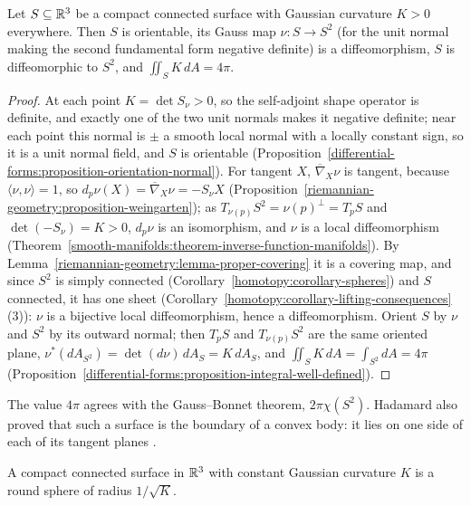 \begin{theorem}[Hadamard]\label{riemannian-geometry:theorem-hadamard}
Let $S \subseteq \mathbb{R}^3$ be a compact connected surface with Gaussian curvature $K > 0$ everywhere. Then $S$ is orientable, its Gauss map $\nu \colon S \to S^2$ (for the unit normal
making the second fundamental form negative definite) is a diffeomorphism, $S$ is diffeomorphic to $S^2$, and $\iint_SK\,dA = 4\pi$.
\end{theorem}

\begin{proof}
At each point $K = \det S_\nu > 0$, so the self-adjoint shape operator is definite, and exactly one of the two unit normals makes it negative definite; near each point this normal is
$\pm$ a smooth local normal with a locally constant sign, so it is a unit normal field, and $S$ is orientable (Proposition~\ref{differential-forms:proposition-orientation-normal}). For
tangent $X$, $\overline{\nabla}_X\nu$ is tangent, because $\langle\nu, \nu\rangle = 1$, so $d_p\nu(X) = \overline{\nabla}_X\nu = -S_\nu X$
(Proposition~\ref{riemannian-geometry:proposition-weingarten}); as $T_{\nu(p)}S^2 = \nu(p)^\perp = T_pS$ and $\det(-S_\nu) = K > 0$, $d_p\nu$ is an isomorphism, and $\nu$ is a local
diffeomorphism (Theorem~\ref{smooth-manifolds:theorem-inverse-function-manifolds}). By Lemma~\ref{riemannian-geometry:lemma-proper-covering} it is a covering map, and since $S^2$ is simply
connected (Corollary~\ref{homotopy:corollary-spheres}) and $S$ connected, it has one sheet (Corollary~\ref{homotopy:corollary-lifting-consequences}(3)): $\nu$ is a bijective local
diffeomorphism, hence a diffeomorphism. Orient $S$ by $\nu$ and $S^2$ by its outward normal; then $T_pS$ and $T_{\nu(p)}S^2$ are the same oriented plane, $\nu^*(dA_{S^2}) = \det(d\nu)\,dA_S = K\,dA_S$,
and $\iint_SK\,dA = \int_{S^2}dA = 4\pi$ (Proposition~\ref{differential-forms:proposition-integral-well-defined}).
\end{proof}

The value $4\pi$ agrees with the Gauss--Bonnet theorem, $2\pi\chi(S^2)$. Hadamard also proved that such a surface is the boundary of a convex body: it lies on one side of each
of its tangent planes \cite[Chapter 5]{do-carmo-curves-surfaces}.

\begin{theorem}[Liebmann]\label{riemannian-geometry:theorem-liebmann}
A compact connected surface in $\mathbb{R}^3$ with constant Gaussian curvature $K$ is a round sphere of radius $1/\sqrt{K}$.
\end{theorem}

